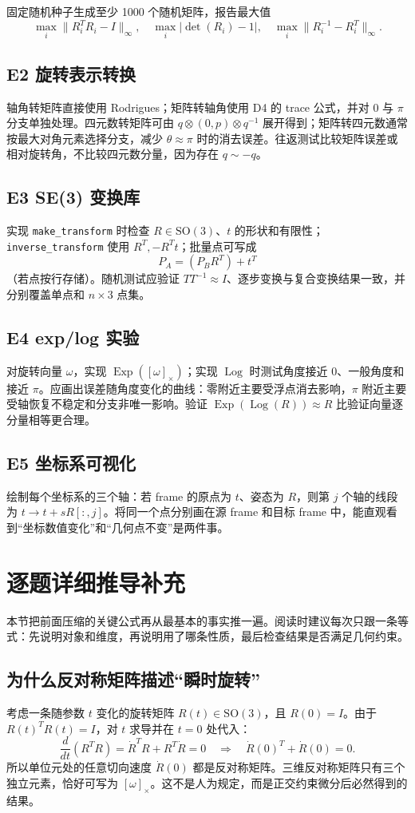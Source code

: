 \documentclass[UTF8,a4paper,11pt]{ctexart}
\newcommand{\SO}{\mathrm{SO}(3)}
\newcommand{\Exp}{\operatorname{Exp}}
\newcommand{\Log}{\operatorname{Log}}
\newcommand{\hatmat}[1]{\left[#1\right]_{\times}}
\begin{document}
固定随机种子生成至少 1000 个随机矩阵，报告最大值
\[
\max_i\|R_i^TR_i-I\|_\infty,\quad
\max_i|\det(R_i)-1|,\quad
\max_i\|R_i^{-1}-R_i^T\|_\infty.
\]

\subsection{E2 旋转表示转换}
轴角转矩阵直接使用 Rodrigues；矩阵转轴角使用 D4 的 trace 公式，并对 $0$ 与 $\pi$ 分支单独处理。四元数转矩阵可由 $q\otimes(0,p)\otimes q^{-1}$ 展开得到；矩阵转四元数通常按最大对角元素选择分支，减少 $\theta\approx\pi$ 时的消去误差。往返测试比较矩阵误差或相对旋转角，不比较四元数分量，因为存在 $q\sim-q$。

\subsection{E3 SE(3) 变换库}
实现 \texttt{make\_transform} 时检查 $R\in\SO$、$t$ 的形状和有限性；\texttt{inverse\_transform} 使用 $R^T,-R^Tt$；批量点可写成
\[
P_A=(P_B R^T)+t^T
\]
（若点按行存储）。随机测试应验证 $TT^{-1}\approx I$、逐步变换与复合变换结果一致，并分别覆盖单点和 $n\times3$ 点集。

\subsection{E4 exp/log 实验}
对旋转向量 $\omega$，实现 $\Exp(\hatmat{\omega})$；实现 $\Log$ 时测试角度接近 $0$、一般角度和接近 $\pi$。应画出误差随角度变化的曲线：零附近主要受浮点消去影响，$\pi$ 附近主要受轴恢复不稳定和分支非唯一影响。验证 $\Exp(\Log(R))\approx R$ 比验证向量逐分量相等更合理。

\subsection{E5 坐标系可视化}
绘制每个坐标系的三个轴：若 frame 的原点为 $t$、姿态为 $R$，则第 $j$ 个轴的线段为 $t\to t+sR[:,j]$。将同一个点分别画在源 frame 和目标 frame 中，能直观看到“坐标数值变化”和“几何点不变”是两件事。

\section{逐题详细推导补充}
本节把前面压缩的关键公式再从最基本的事实推一遍。阅读时建议每次只跟一条等式：先说明对象和维度，再说明用了哪条性质，最后检查结果是否满足几何约束。

\subsection{为什么反对称矩阵描述“瞬时旋转”}
考虑一条随参数 $t$ 变化的旋转矩阵 $R(t)\in\SO$，且 $R(0)=I$。由于 $R(t)^TR(t)=I$，对 $t$ 求导并在 $t=0$ 处代入：
\[
\frac{d}{dt}(R^TR)=\dot R^TR+R^T\dot R=0
\quad\Longrightarrow\quad
\dot R(0)^T+\dot R(0)=0.
\]
所以单位元处的任意切向速度 $\dot R(0)$ 都是反对称矩阵。三维反对称矩阵只有三个独立元素，恰好可写为 $\hatmat{\omega}$。这不是人为规定，而是正交约束微分后必然得到的结果。
\end{document}
